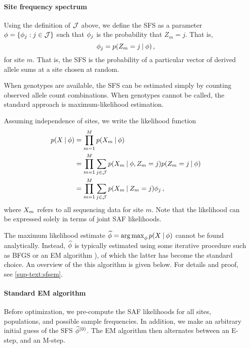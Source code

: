 \paragraph{Site frequency spectrum}

Using the definition of $\mathcal{J}$ above, we define the SFS as a parameter $\phi = \{\phi_j : j \in \mathcal{J}\}$ such that $\phi_j$ is the probability that $Z_m = j$.
That is,
%
\begin{equation}
    \sfs_j = \prob(\ct[m] = j \given \sfs)
    \, ,
\end{equation}
%
for site $m$. That is, the SFS is the probability of a particular vector of derived allele sums at a site chosen at random.

When genotypes are available, the SFS can be estimated simply by counting observed allele count combinations.
When genotypes cannot be called, the standard approach is maximum-likelihood estimation.

Assuming independence of sites, we write the likelihood function
%
\begin{align}\label{eq:likelihood}
    \prob(X \given \sfs)
    &= \prod_{m = 1}^M 
        \prob(\data[m] \given \sfs) \nonumber \\
    &= \prod_{m = 1}^M \sum_{j \in \ctset}
        \prob(\data[m] \given \sfs, \ct[m] = j) \prob(\ct[m]  = j \given \sfs) \nonumber \\
    &= \prod_{m = 1}^M \sum_{j \in \ctset} 
        \prob(\data[m] \given \ct[m] = j) \sfs_j 
    \, ,
\end{align}
%
where $\data[m]$ refers to all sequencing data for site $m$. Note that the likelihood can be expressed solely in terms of joint SAF likelihoods.

The maximum likelihood estimate $\estsfs = \argmax_{\sfs} \prob(\data \given \sfs)$ cannot be found analytically.
Instead, $\estsfs$ is typically estimated using some iterative procedure such as BFGS \cite{Nielsen2012} or an EM algorithm \cite{Li2011, Korneliussen2014}), of which the latter has become the standard choice.
An overview of the this algorithm is given below.
For details and proof, see \cref{sup-text:sfsem}.

\paragraph{Standard EM algorithm}

Before optimization, we pre-compute the SAF likelihoods for all sites, populations, and possible sample frequencies.
In addition, we make an arbitrary initial guess of the SFS $\estsfs[0]$.
The EM algorithm then alternates between an E-step, and an M-step.

